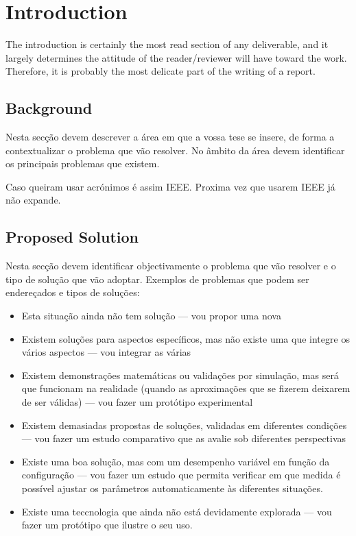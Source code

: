 \chapter{Introduction}
\label{chapter:introduction}
The introduction is certainly the most read section of any deliverable, and it largely determines the attitude of the reader/reviewer will have toward the work. Therefore, it is probably the most delicate part of the writing of a report.

\section{Background}
\label{section:background}
Nesta secção devem descrever a área em que a vossa tese se insere, de forma
a contextualizar o problema que vão resolver. No âmbito da área devem
identificar os principais problemas que existem.

Caso queiram usar acrónimos é assim \ac{IEEE}.
Proxima vez que usarem \ac{IEEE} já não expande.

\section{Proposed Solution}
\label{section:proposed}
Nesta secção devem identificar objectivamente o problema que vão resolver e o
tipo de solução que vão adoptar.
Exemplos de problemas que podem ser endereçados e tipos de soluções:

\begin{itemize}
\item Esta situação ainda não tem solução --- vou propor uma nova
\item Existem soluções para aspectos específicos, mas não existe uma que integre
os vários aspectos --- vou integrar as várias
\item Existem demonstrações matemáticas ou validações por simulação, mas
será que funcionam na realidade (quando as aproximações que se fizerem
deixarem de ser válidas) --- vou fazer um protótipo experimental
\item Existem demasiadas propostas de soluções, validadas em diferentes
condições --- vou fazer um estudo comparativo que as avalie sob diferentes
perspectivas
\item Existe uma boa solução, mas com um desempenho variável em função da
configuração --- vou fazer um estudo que permita verificar em que medida é
possível ajustar os parâmetros automaticamente às diferentes situações.
\item Existe uma teccnologia que ainda não está devidamente explorada --- vou
fazer um protótipo que ilustre o seu uso.
\end{itemize}

